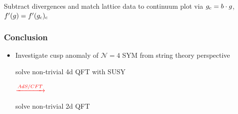 \documentclass{beamer}
\begin{document}
{%

\begin{frame}
Subtract divergences and match lattice data to continuum plot via $g_{\rm c} = b \cdot g$, $f'(g)=f'(g_{\rm c})_{\rm c}$

\begin{center}

\end{center}
\end{frame}

}

\begin{frame}
\frametitle{Conclusion}

\begin{itemize}
\item<1-> Investigate cusp anomaly of $\mathcal{N}=4$ SYM from string theory perspective\\[2mm]
\begin{minipage}{0.38\linewidth}
\begin{center}
solve non-trivial 4d QFT with SUSY
\end{center}
\end{minipage}
\begin{minipage}{0.18\linewidth}
$\xrightarrow{\color{red} AdS/CFT}{}$
\end{minipage}
\begin{minipage}{0.38\linewidth}
solve non-trivial 2d QFT
\end{minipage}
\vspace{2mm}
\begin{itemize}

\end{itemize}
\end{itemize}
\end{frame}
\end{document}
